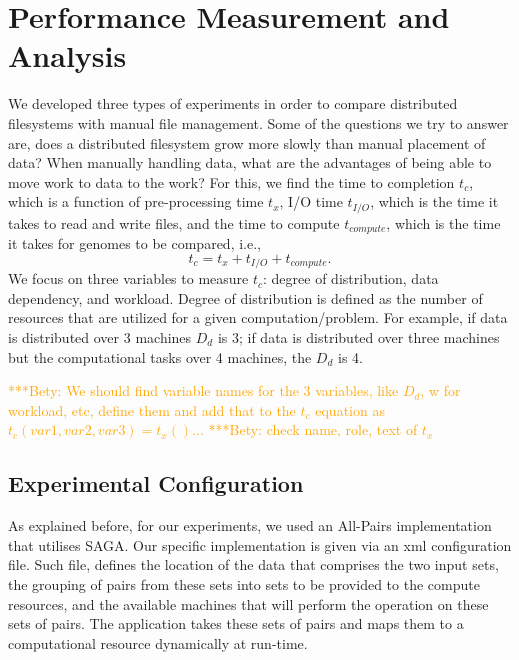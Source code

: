 \documentclass{rspublic}
\newcommand{\micnote}[1]{ {\textcolor{blue} { ***Michael: #1 }}}
\newcommand{\betynote}[1]{ {\textcolor{orange} { ***Bety: #1 }}}
\newcommand{\jhanote}[1]{} \newcommand{\micnote}[1]{}\newcommand{\betynote}[1]{} \newcommand{\fixme}[1]{}
\begin{document}
\section{Performance Measurement and Analysis} We developed three types
of experiments in order to compare distributed filesystems with manual
file management. Some of the questions we try to answer are, does a
distributed filesystem grow more slowly than manual placement of data?
When manually handling data, what are the advantages of being able to
move work to data to the work? For this, we find the time to completion
$t_c$, which is a function of pre-processing time $t_x$, I/O time
$t_{I/O}$, which is the time it takes to read and write files, and the
time to compute $t_{compute}$, which is the time it takes for genomes to
be compared, i.e.,
 \begin{equation}
t_c = t_x + t_{I/O} + t_{compute}.
\end{equation}
We focus on three variables to measure $t_c$: degree of distribution, data
dependency, and workload. Degree of distribution is defined as the
number
of resources that are utilized for a given computation/problem. For
example, if data is distributed over 3 machines $D_d$ is 3; if data is
distributed over three machines but the computational tasks over
4 machines, the $D_d$ is 4. 

\betynote{We should find variable names for the 3 variables, like $D_d$,
w for workload, etc, define them and add that to the $t_c$ equation as
$t_c(var1, var2, var3) = t_x()$...}
\betynote{check name, role, text of $t_x$}
\jhanote{not sure that data-dependency needs a variable}

\subsection{Experimental Configuration}

As explained before, for our experiments, we used an All-Pairs implementation
that utilises SAGA. Our specific implementation is given via an xml
configuration file. Such file, defines the location of the data that comprises
the two input sets, the grouping of pairs from these sets into sets to be
provided to the compute resources, and the available machines that will perform
the operation on these sets of pairs. The application takes these sets of pairs
and maps them to a computational resource dynamically at run-time.
\end{document}
